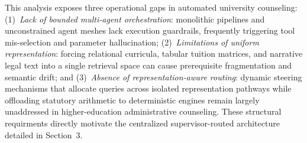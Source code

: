 This analysis exposes three operational gaps in automated university counseling: (1)~\emph{Lack of bounded multi-agent orchestration}: monolithic pipelines and unconstrained agent meshes lack execution guardrails, frequently triggering tool mis-selection and parameter hallucination; (2)~\emph{Limitations of uniform representation}: forcing relational curricula, tabular tuition matrices, and narrative legal text into a single retrieval space can cause prerequisite fragmentation and semantic drift; and (3)~\emph{Absence of representation-aware routing}: dynamic steering mechanisms that allocate queries across isolated representation pathways while offloading statutory arithmetic to deterministic engines remain largely unaddressed in higher-education administrative counseling. These structural requirments directly motivate the centralized supervisor-routed architecture detailed in Section~3.
